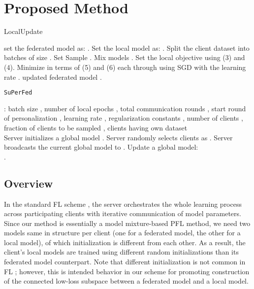 \documentclass[sigconf]{acmart}
\begin{document}
\section{Proposed Method}
\begin{algorithm}[!tb]
\caption{LocalUpdate}
\label{alg:LocalUpdate}
\begin{algorithmic}
 set the federated model as: .
\STATE Set the local model as: .
\ENDIF
\FOR{}
\STATE Split the client dataset  into batches of size .
\IF{}
\STATE Set 
\ELSE
\STATE Sample .
\ENDIF
\STATE Mix models .
\STATE Set the local objective  using (3) and (4).
\STATE Minimize  in terms of  (5) and  (6) each through  using SGD with the learning rate .
\ENDFOR
\ENDFOR
{} updated federated model .
\end{algorithmic}
\end{algorithm}
\begin{algorithm}[!tb]
\caption{\texttt{SuPerFed}}
\label{alg:SuPerFed}
\begin{algorithmic}
: batch size , number of local epochs , total communication rounds , start round of personalization , learning rate , regularization constants , number of clients , fraction of clients to be sampled , clients  having own dataset  \\ 
 Server initializes a global model .
\FOR{}
\STATE Server randomly selects  clients as .
\STATE Server broadcasts the current global model  to .
    \STATE  {}
\ENDFOR
\STATE Update a global model: \\
.
\ENDFOR
\end{algorithmic}
\end{algorithm}
\subsection{Overview} In the standard FL scheme \cite{mc+17}, the server orchestrates the whole learning process across participating clients with iterative communication of model parameters. Since our method is essentially a model mixture-based PFL method, we need two models same in structure per client (one for a federated model, the other for a local model), of which initialization is different from each other. As a result, the client's local models are trained using different random initializations than its federated model counterpart. Note that different initialization is not common in FL \cite{mc+17}; however, this is intended behavior in our scheme for promoting construction of the connected low-loss subspace between a federated model and a local model.  
\end{document}
